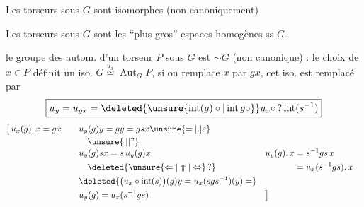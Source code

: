 
Les torseurs sous $G$ sont isomorphes (non canoniquement)

Les torseurs sous $G$ sont les ``plus gros'' espaces homogènes ss $G$.

le groupe des autom. d'un torseur $P$ sous $G$ est $\sim G$ (non canonique) : le choix de $x\in P$ définit un iso. $G\overset{u_x}{\simeq}\operatorname{Aut}_{G}P$, si on remplace $x$ par $gx$, cet iso. est remplacé par
\[
\boxed{u_y=u_{gx}=\deleted{\unsure{\operatorname{int}(g)\circ|\operatorname{int}g\circ}}u_x\circ\,?\operatorname{int}(s^{-1})}
\]
{\small
\[
\begin{aligned}
\bigl[\,u_x(g).\,x=gx\qquad &u_y(g)y=gy=gsx\unsure{=|\mathord{.}|\varepsilon}\\
&\quad\unsure{\Vert|\text{''}}\\[-3pt]
&u_y(g)sx=s\,u_y(g)x
\qquad &&u_y(g).\,x=s^{-1}gs\,x\\
&\hspace{1em}\deleted{\unsure{\Leftarrow|\Uparrow|\Leftrightarrow}\,?}
&&\phantom{u_y(g).\,x}{}=u_x(s^{-1}gs).\,x\\
&\deleted{\bigl(u_x\circ\operatorname{int}(s)\bigr)(g)y=u_x(sgs^{-1})(y)=}\\
&u_y(g)=u_x(s^{-1}gs)\hspace{3em}&&\bigr]
\end{aligned}
\]}
